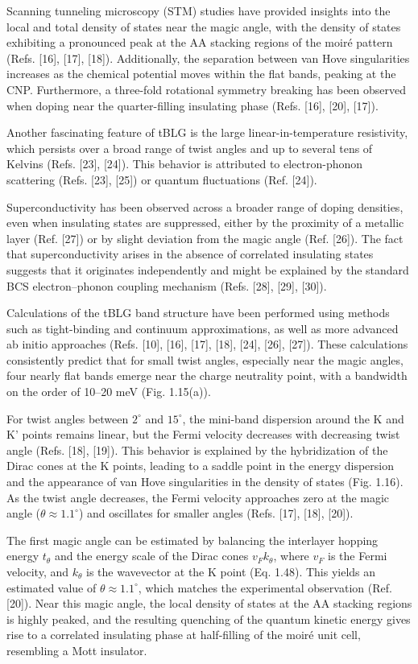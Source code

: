 Scanning tunneling microscopy (STM) studies have provided insights into the local and total density of states near the magic angle, with the density of states exhibiting a pronounced peak at the AA stacking regions of the moiré pattern (Refs. [16], [17], [18]). Additionally, the separation between van Hove singularities increases as the chemical potential moves within the flat bands, peaking at the CNP. Furthermore, a three-fold rotational symmetry breaking has been observed when doping near the quarter-filling insulating phase (Refs. [16], [20], [17]).

Another fascinating feature of tBLG is the large linear-in-temperature resistivity, which persists over a broad range of twist angles and up to several tens of Kelvins (Refs. [23], [24]). This behavior is attributed to electron-phonon scattering (Refs. [23], [25]) or quantum fluctuations (Ref. [24]).

Superconductivity has been observed across a broader range of doping densities, even when insulating states are suppressed, either by the proximity of a metallic layer (Ref. [27]) or by slight deviation from the magic angle (Ref. [26]). The fact that superconductivity arises in the absence of correlated insulating states suggests that it originates independently and might be explained by the standard BCS electron–phonon coupling mechanism (Refs. [28], [29], [30]).

Calculations of the tBLG band structure have been performed using methods such as tight-binding and continuum approximations, as well as more advanced ab initio approaches (Refs. [10], [16], [17], [18], [24], [26], [27]). These calculations consistently predict that for small twist angles, especially near the magic angles, four nearly flat bands emerge near the charge neutrality point, with a bandwidth on the order of 10–20 meV (Fig. 1.15(a)).

For twist angles between \(2^\circ\) and \(15^\circ\), the mini-band dispersion around the K and K' points remains linear, but the Fermi velocity decreases with decreasing twist angle (Refs. [18], [19]). This behavior is explained by the hybridization of the Dirac cones at the K points, leading to a saddle point in the energy dispersion and the appearance of van Hove singularities in the density of states (Fig. 1.16). As the twist angle decreases, the Fermi velocity approaches zero at the magic angle (\(\theta \approx 1.1^\circ\)) and oscillates for smaller angles (Refs. [17], [18], [20]).

The first magic angle can be estimated by balancing the interlayer hopping energy \(t_\theta\) and the energy scale of the Dirac cones \(v_F k_\theta\), where \(v_F\) is the Fermi velocity, and \(k_\theta\) is the wavevector at the K point (Eq. 1.48). This yields an estimated value of \(\theta \approx 1.1^\circ\), which matches the experimental observation (Ref. [20]). Near this magic angle, the local density of states at the AA stacking regions is highly peaked, and the resulting quenching of the quantum kinetic energy gives rise to a correlated insulating phase at half-filling of the moiré unit cell, resembling a Mott insulator.

